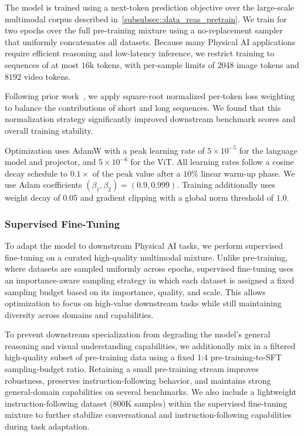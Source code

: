 The model is trained using a next-token prediction objective over the large-scale multimodal corpus described in~\cref{subsubsec::data_reas_pretrain}. We train for two epochs over the full pre-training mixture using a no-replacement sampler that uniformly concatenates all datasets. Because many Physical AI applications require efficient reasoning and low-latency inference, we restrict training to sequences of at most $16$k tokens, with per-sample limits of $2048$ image tokens and $8192$ video tokens.

Following prior work~\citep{bai2025qwen3, wang2025internvl35}, we apply square-root normalized per-token loss weighting to balance the contributions of short and long sequences. We found that this normalization strategy significantly improved downstream benchmark scores and overall training stability.


Optimization uses AdamW with a peak learning rate of $5{\times}10^{-5}$ for the language model and projector, and $5{\times}10^{-6}$ for the ViT. All learning rates follow a cosine decay schedule to $0.1{\times}$ of the peak value after a $10\%$ linear warm-up phase. We use Adam coefficients $(\beta_1, \beta_2) = (0.9, 0.999)$. Training additionally uses weight decay of $0.05$ and gradient clipping with a global norm threshold of $1.0$.

\subsubsection{Supervised Fine-Tuning}

To adapt the model to downstream Physical AI tasks, we perform supervised fine-tuning on a curated high-quality multimodal mixture. Unlike pre-training, where datasets are sampled uniformly across epochs, supervised fine-tuning uses an importance-aware sampling strategy in which each dataset is assigned a fixed sampling budget based on its importance, quality, and scale. This allows optimization to focus on high-value downstream tasks while still maintaining diversity across domains and capabilities.

To prevent downstream specialization from degrading the model's general reasoning and visual understanding capabilities, we additionally mix in a filtered high-quality subset of pre-training data using a fixed 1:4 pre-training-to-SFT sampling-budget ratio. Retaining a small pre-training stream improves robustness, preserves instruction-following behavior, and maintains strong general-domain capabilities on several benchmarks. We also include a lightweight instruction-following dataset (800K samples) within the supervised fine-tuning mixture to further stabilize conversational and instruction-following capabilities during task adaptation.

